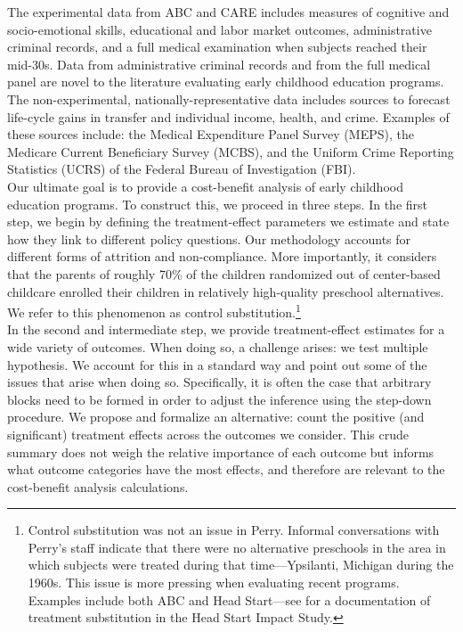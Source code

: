\noindent The experimental data from ABC and CARE includes measures of cognitive and socio-emotional skills, educational and labor market outcomes, administrative criminal records, and a full medical examination when subjects reached their mid-30s. Data from administrative criminal records and from the full medical panel are novel to the literature evaluating early childhood education programs. The non-experimental, nationally-representative data includes sources to forecast life-cycle gains in transfer and individual income, health, and crime. Examples of these sources include: the Medical Expenditure Panel Survey (MEPS), the Medicare Current Beneficiary Survey (MCBS), and the Uniform Crime Reporting Statistics (UCRS) of the Federal Bureau of Investigation (FBI).\\

\noindent Our ultimate goal is to provide a cost-benefit analysis of early childhood education programs. To construct this, we proceed in three steps. In the first step, we begin by defining the treatment-effect parameters we estimate and state how they link to different policy questions. Our methodology accounts for different forms of attrition and non-compliance. More importantly, it considers that the parents of roughly 70\% of the children randomized out of center-based childcare enrolled their children in relatively high-quality preschool alternatives. We refer to this phenomenon as control substitution.\footnote{Control  substitution was not an issue in Perry. Informal conversations with Perry's staff indicate that there were no alternative preschools in the area in which subjects were treated during that time---Ypsilanti, Michigan during the 1960s. This issue is more pressing when evaluating recent programs. Examples include both ABC and Head Start---see \citep{Puma_Bell_etal_2010_HeadStartImpact} for a documentation of treatment substitution in the Head Start Impact Study.}\\

\noindent In the second and intermediate step, we provide treatment-effect estimates for a wide variety of outcomes. When doing so, a challenge arises: we test multiple hypothesis. We account for this in a standard way \citep{Lehman_Romano_2005_AnnStat,Romano_Shaikh_2006_AnnStat} and point out some of the issues that arise when doing so. Specifically, it is often the case that arbitrary blocks need to be formed in order to adjust the inference using the step-down procedure. We propose and formalize an alternative: count the positive (and significant) treatment effects across the outcomes we consider. This crude summary does not weigh the relative importance of each outcome but informs what outcome categories have the most effects, and therefore are relevant to the cost-benefit analysis calculations.\\ 

